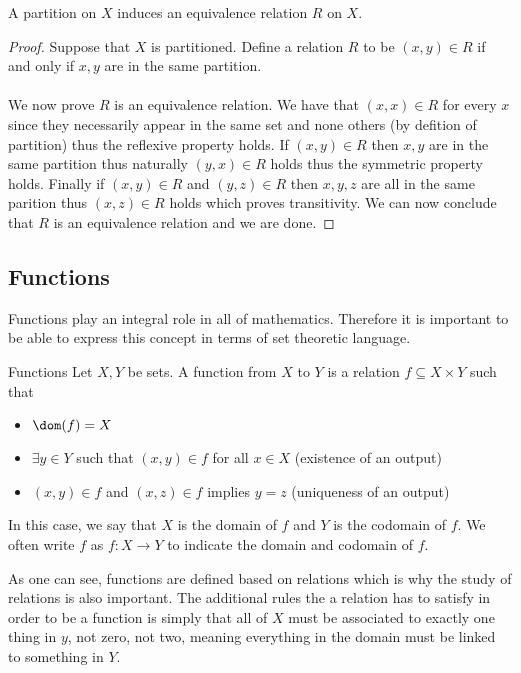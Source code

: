 \begin{thm}{}{} A partition on $X$ induces an equivalence relation $R$ on $X$. \tcbline
\begin{proof} Suppose that $X$ is partitioned. Define a relation $R$ to be $(x,y)\in R$ if and only if $x,y$ are in the same partition. \\~\\

We now prove $R$ is an equivalence relation. We have that $(x,x)\in R$ for every $x$ since they necessarily appear in the same set and none others (by defition of partition) thus the reflexive property holds. If $(x,y)\in R$ then $x,y$ are in the same partition thus naturally $(y,x)\in R$ holds thus the symmetric property holds. Finally if $(x,y)\in R$ and $(y,z)\in R$ then $x,y,z$ are all in the same parition thus $(x,z)\in R$ holds which proves transitivity. We can now conclude that $R$ is an equivalence relation and we are done. 
\end{proof}
\end{thm}

\subsection{Functions}
Functions play an integral role in all of mathematics. Therefore it is important to be able to express this concept in terms of set theoretic language. 
\begin{defn}{Functions}{} Let $X,Y$ be sets. A function from $X$ to $Y$ is a relation $f\subseteq X\times Y$ such that
\begin{itemize}
\item $\dom(f)=X$
\item $\exists y\in Y$ such that $(x,y)\in f$ for all $x\in X$ (existence of an output)
\item $(x,y)\in f$ and $(x,z)\in f$ implies $y=z$ (uniqueness of an output)
\end{itemize}
In this case, we say that $X$ is the domain of $f$ and $Y$ is the codomain of $f$. We often write $f$ as $f:X\to Y$ to indicate the domain and codomain of $f$. 
\end{defn}

As one can see, functions are defined based on relations which is why the study of relations is also important. The additional rules the a relation has to satisfy in order to be a function is simply that all of $X$ must be associated to exactly one thing in $y$, not zero, not two, meaning everything in the domain must be linked to something in $Y$. \\~\\

